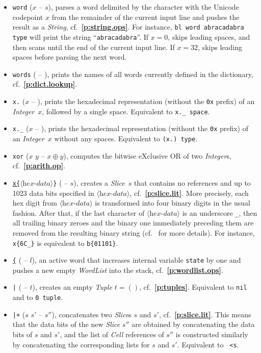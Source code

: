 \documentclass[12pt,oneside]{article}
\def\refpoint#1{{\rm\textbf{\ref{#1}}}}
\let\ptref=\refpoint
\begin{document}
\begin{itemize}
\item {\tt word} ($x$ -- $s$), parses a word delimited by the character with the Unicode codepoint $x$ from the remainder of the current input line and pushes the result as a {\em String}, cf.~\ptref{p:string.ops}. For instance, {\tt bl word abracadabra type} will print the string ``{\tt abracadabra}''. If $x=0$, skips leading spaces, and then scans until the end of the current input line. If $x=32$, skips leading spaces before parsing the next word.
\item {\tt words} ( -- ), prints the names of all words currently defined in the dictionary, cf.~\ptref{p:dict.lookup}.
\item {\tt x.} ($x$ -- ), prints the hexadecimal representation (without the {\tt 0x} prefix) of an {\em Integer\/}~$x$, followed by a single space. Equivalent to {\tt x.\_ space}.
\item {\tt x.\_} ($x$ -- ), prints the hexadecimal representation (without the {\tt 0x} prefix) of an {\em Integer\/}~$x$ without any spaces. Equivalent to {\tt (x.)~type}.
\item {\tt xor} ($x$ $y$ -- $x\oplus y$), computes the bitwise eXclusive OR of two {\em Integer\/}s, cf.~\ptref{p:arith.op}.
\item {\tt \underline{x\{}$\langle\textit{hex-data}\rangle$\}} ( -- $s$), creates a {\em Slice}~$s$ that contains no references and up to 1023 data bits specified in $\langle\textit{hex-data}\rangle$, cf.~\ptref{p:slice.lit}. More precisely, each hex digit from $\langle\textit{hex-data}\rangle$ is transformed into four binary digits in the usual fashion. After that, if the last character of $\langle\textit{hex-data}\rangle$ is an underscore {\tt \_}, then all trailing binary zeroes and the binary one immediately preceding them are removed from the resulting binary string (cf.~\cite[1.0]{TVM} for more details). For instance, {\tt x\{6C\_\}} is equivalent to {\tt b\{01101\}}.
\item {\tt \underline{\{}} ( -- $l$), an active word that increases internal variable {\tt state} by one and pushes a new empty {\em WordList\/} into the stack, cf.~\ptref{p:wordlist.ops}.
\item {\tt |} ( -- $t$), creates an empty {\em Tuple\/} $t=()$, cf.~\ptref{p:tuples}. Equivalent to {\tt nil} and to {\tt 0 tuple}.
\item {\tt |+} ($s$ $s'$ -- $s''$), concatenates two {\em Slice}\/s $s$ and $s'$, cf.~\ptref{p:slice.lit}. This means that the data bits of the new {\em Slice\/} $s''$ are obtained by concatenating the data bits of $s$ and $s'$, and the list of {\em Cell\/} references of $s''$ is constructed similarly by concatenating the corresponding lists for $s$ and $s'$. Equivalent to {\tt <b rot s, swap s, b> <s}.

\end{itemize}
\end{document}
